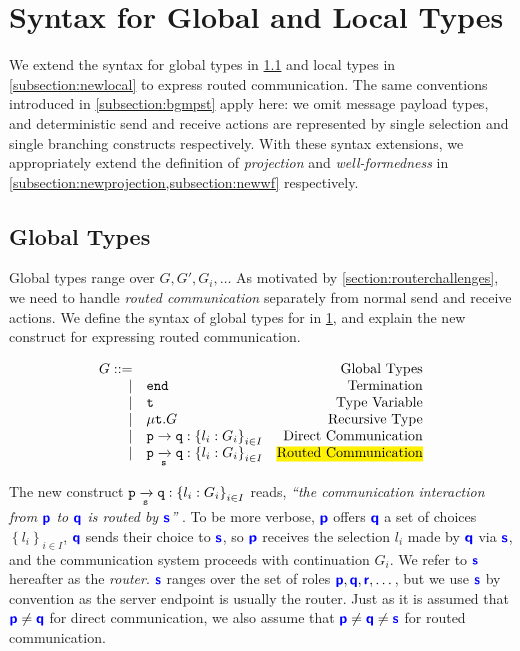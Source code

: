 \section{Syntax for Global and Local Types}
\label{section:syntax}

We extend the syntax for global types
in \cref{subsection:newglobal} and
local types in \cref{subsection:newlocal}
to express routed communication.
The same conventions introduced in \cref{subsection:bgmpst}
apply here: 
we omit message payload types,
and deterministic send and receive actions
are represented by single selection and
single branching constructs respectively.
With these syntax extensions, we appropriately extend
the definition of \textit{projection} and 
\textit{well-formedness} in 
\cref{subsection:newprojection,subsection:newwf}
respectively.

\subsection{Global Types}
\label{subsection:newglobal}

Global types range over $G, G', G_i, \dots$
As motivated by \cref{section:routerchallenges},
we need to handle \textit{routed communication} separately
from normal send and receive actions.
We define the syntax of global types for \newtheory 
in \cref{fig:newsyntaxglobal}, and explain the 
new construct for expressing routed communication.

\begin{figure}[!h]
\doublespacing
\[
\begin{array}{rlr}
G ::= & & \text{Global Types} \\
\mid & \tend & \text{Termination} \\
\mid & \trecvar & \text{Type Variable} \\
\mid & \trec{G} & \text{Recursive Type} \\
\mid & \gcomm{p}{q}{l_i: G_i}{i \in I} & \text{Direct Communication} \\
\mid & \groute{p}{q}{s}{l_i: G_i}{i \in I}
	& \text{\hl{Routed Communication}} \\
\end{array}
\]
\singlespacing
{}
\label{fig:newsyntaxglobal}
\end{figure}

The new construct $\groute{p}{q}{s}{l_i: G_i}{i \in I}$ reads, 
\textit{
``the communication interaction 
from $\role{p}$ to $\role{q}$
is routed by $\role{s}$''
}.
To be more verbose,
$\role{p}$ offers $\role{q}$ a set of choices
$\left\{l_i\right\}_{i \in I}$,
$\role{q}$ sends their choice to
$\role{s}$, so $\role{p}$ receives the
selection $l_i$ made by $\role{q}$ via $\role{s}$,
and the communication system proceeds with continuation $G_i$.
We refer to $\role{s}$ hereafter as the \textit{router}.
$\role{s}$ ranges over the set of roles 
$\role{p},\role{q},\role{r},\dots$,
but we use $\role{s}$ by convention as the server endpoint
is usually the router.
Just as it is assumed that $\role{p} \neq \role{q}$ for
direct communication,
we also assume that
$\role{p} \neq \role{q} \neq \role{s}$ for routed communication.

